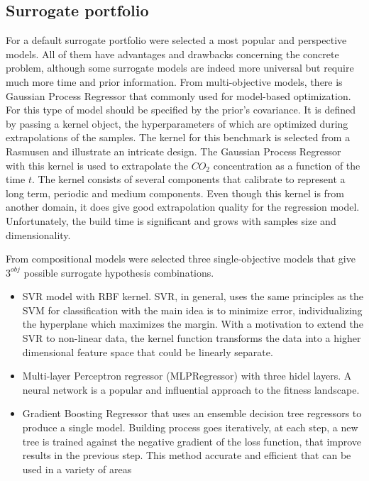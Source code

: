 
    \subsection{Surrogate portfolio}
        For a default surrogate portfolio were selected a most popular and perspective models. All of them have advantages and drawbacks concerning the concrete problem, although some surrogate models are indeed more universal but require much more time and prior information. From multi-objective models, there is Gaussian Process Regressor that commonly used for model-based optimization. For this type of model should be specified by the prior's covariance. It is defined by passing a kernel object, the hyperparameters of which are optimized during extrapolations of the samples. The kernel for this benchmark is selected from a Rasmusen and illustrate an intricate design. The Gaussian Process Regressor with this kernel is used to extrapolate the $CO_2$ concentration as a function of the time $t$. The kernel consists of several components that calibrate to represent a long term, periodic and medium components. Even though this kernel is from another domain, it does give good extrapolation quality for the regression model. Unfortunately, the build time is significant and grows with samples size and dimensionality.

        From compositional models were selected three single-objective models that give $3^{obj}$ possible surrogate hypothesis combinations. 
        \begin{itemize}
            \item SVR model with RBF kernel. SVR, in general, uses the same principles as the SVM for classification with the main idea is to minimize error, individualizing the hyperplane which maximizes the margin. With a motivation to extend the SVR to non-linear data, the kernel function transforms the data into a higher dimensional feature space that could be linearly separate.
            \item Multi-layer Perceptron regressor (MLPRegressor) with three hidel layers. A neural network is a popular and influential approach to the fitness landscape.
            \item Gradient Boosting Regressor that uses an ensemble decision tree regressors to produce a single model. Building process goes iteratively, at each step, a new tree is trained against the negative gradient of the loss function, that improve results in the previous step. This method accurate and efficient that can be used in a variety of areas
        \end{itemize}
        
